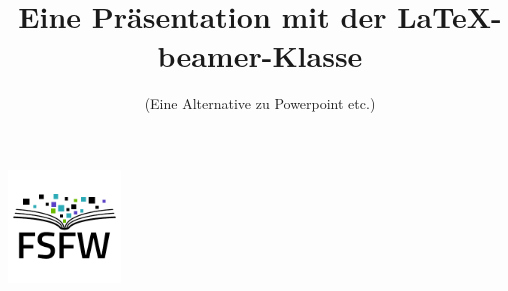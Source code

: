 \documentclass{beamer}
\title{Eine Präsentation mit der \LaTeX-beamer-Klasse}
\subtitle{(Eine Alternative zu Powerpoint etc.)}
\begin{document}
\begin{frame} %
  \begin{center}%
    \includegraphics[width=3cm]{img-src/fsfw-logo-with-text.pdf}\\

    \vspace*{-0.5\baselineskip}

    \parbox{.95\columnwidth}{\centering\Large\inserttitle}

    \vspace*{\baselineskip}

    \structure{\large \insertsubtitle}
  \end{center}
\end{frame}



\end{document}
